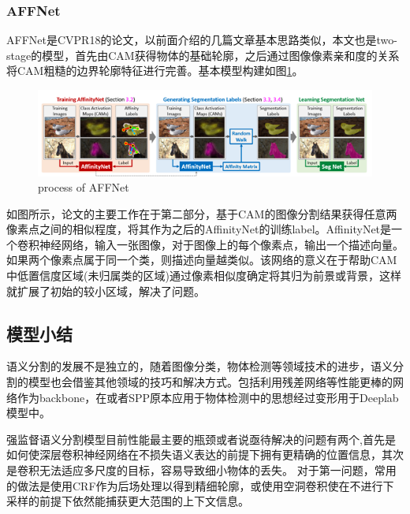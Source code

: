 \documentclass{article}
\begin{document}
\begin{CJK}{UTF8}{gbsn}
\subsubsection{AFFNet}
AFFNet\cite{ahn2018learning}是CVPR18的论文，以前面介绍的几篇文章\cite{kolesnikov2016seed,wei2017object}基本思路类似，本文也是two-stage的模型，首先由CAM\cite{zhou2016learning}获得物体的基础轮廓，之后通过图像像素亲和度的关系将CAM\cite{zhou2016learning}粗糙的边界轮廓特征进行完善。基本模型构建如图\ref{AFFNet}。
\begin{figure}[h]
    \centering
    \includegraphics[scale=0.7]{imgs/2-11_process_of_AFFNet.png}
    \caption{process of AFFNet}
    \label{AFFNet}
\end{figure}

如图所示，论文的主要工作在于第二部分，基于CAM\cite{zhou2016learning}的图像分割结果获得任意两像素点之间的相似程度，将其作为之后的AffinityNet的训练label。AffinityNet是一个卷积神经网络，输入一张图像，对于图像上的每个像素点，输出一个描述向量。如果两个像素点属于同一个类，则描述向量越类似。该网络的意义在于帮助CAM\cite{zhou2016learning}中低置信度区域(未归属类的区域)通过像素相似度确定将其归为前景或背景，这样就扩展了初始的较小区域，解决了问题。

\subsection{模型小结}
语义分割的发展不是独立的，随着图像分类，物体检测等领域技术的进步，语义分割的模型也会借鉴其他领域的技巧和解决方式。包括利用残差网络等性能更棒的网络作为backbone，在或者SPP原本应用于物体检测中的思想经过变形用于Deeplab模型中。

强监督语义分割模型目前性能最主要的瓶颈或者说亟待解决的问题有两个,首先是如何使深层卷积神经网络在不损失语义表达的前提下拥有更精确的位置信息，其次是卷积无法适应多尺度的目标，容易导致细小物体的丢失。
对于第一问题，常用的做法是使用CRF作为后场处理以得到精细轮廓，或使用空洞卷积使在不进行下采样的前提下依然能捕获更大范围的上下文信息。


\end{CJK}
\end{document}

